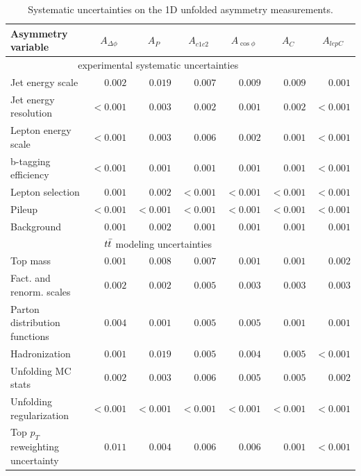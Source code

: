 \begin{table}[!h]
\begin{center}
\caption{Systematic uncertainties on the 1D unfolded asymmetry measurements.}
\label{tab:afb:systematics}
\begin{tabular}{l||r|r|r|r|r|r}
\hline
Asymmetry variable              &       \multicolumn{1}{c|}{$A_{\Delta\phi}$}           &       \multicolumn{1}{c|}{$A_{P}$}
        &       \multicolumn{1}{c|}{$A_{c1c2}$}         &       \multicolumn{1}{c|}{$A_{\cos\phi}$} &       \multicolumn{1}{c|}{$A_{C}$}  & \multicolumn{1}{c|}{$A_{lepC}$} \\
\hline
\hline
\multicolumn{6}{c}{experimental systematic uncertainties}       \\
\hline
Jet energy scale                  & $0.002$ & $0.019$ & $0.007$ & $0.009$ & $0.009$ & $0.001$ \\
Jet energy resolution             & $<0.001$ & $0.003$ & $0.002$ & $0.001$ & $0.002$ & $<0.001$ \\
Lepton energy scale               & $<0.001$ & $0.003$ & $0.006$ & $0.002$ & $0.001$ & $<0.001$ \\
b-tagging efficiency              & $<0.001$ & $0.001$ & $0.001$ & $0.001$ & $0.001$ & $<0.001$ \\
Lepton selection                  & $0.001$ & $0.002$ & $<0.001$ & $<0.001$ & $<0.001$ & $<0.001$ \\
Pileup                            & $<0.001$ & $<0.001$ & $<0.001$ & $<0.001$ & $<0.001$ & $<0.001$ \\
Background                        & $0.001$ & $0.002$ & $0.001$ & $0.001$ & $0.001$ & $0.001$ \\
\hline
\hline
\multicolumn{6}{c}{$t\bar{t}$ modeling uncertainties}      \\
\hline
Top mass                          & $0.001$ & $0.008$ & $0.007$ & $0.001$ & $0.001$ & $0.002$ \\
Fact. and renorm. scales          & $0.002$ & $0.002$ & $0.005$ & $0.003$ & $0.003$ & $0.003$ \\
Parton distribution functions     & $0.004$ & $0.001$ & $0.005$ & $0.005$ & $0.001$ & $0.001$ \\
Hadronization                     & $0.001$ & $0.019$ & $0.005$ & $0.004$ & $0.005$ & $<0.001$ \\
\hline
\hline
Unfolding MC stats                & $0.002$ & $0.003$ & $0.006$ & $0.005$ & $0.005$ & $0.002$ \\
Unfolding regularization          & $<0.001$ & $<0.001$ & $<0.001$ & $<0.001$ & $<0.001$ & $<0.001$ \\
\hline
\hline
Top $p_T$ reweighting uncertainty & $0.011$ & $0.004$ & $0.006$ & $0.006$ & $0.001$ & $<0.001$ \\
\hline
\end{tabular}
\end{center}
\end{table}

